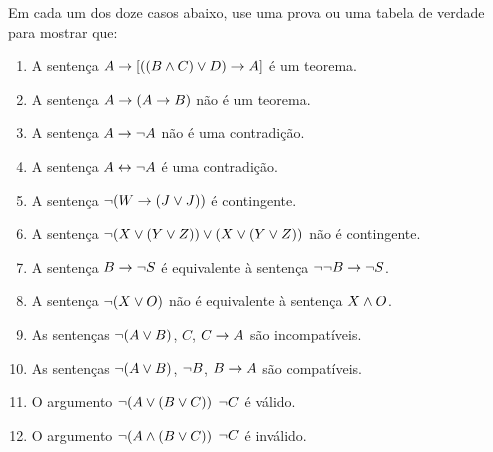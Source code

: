 \practiceproblems
\noindent\problempart Em cada um dos doze casos abaixo, use uma  prova ou uma tabela de verdade para mostrar que: 
\begin{enumerate}%
\item  A sentença $A \rightarrow [((B \wedge C) \vee D) \rightarrow A]$  é um teorema.
\item  A sentença $A \rightarrow (A \rightarrow B)$  não é um teorema.
\item  A sentença $A \rightarrow \neg{A}$ não é uma contradição. 
\item  A sentença $A \leftrightarrow \neg A$ é uma contradição.  
\item  A sentença $ \neg (W \rightarrow (J \vee J)) $  é contingente.
\item  A sentença $ \neg(X \vee (Y \vee Z)) \vee (X \vee (Y \vee Z))$  não é contingente.
\item  A sentença $B \rightarrow \neg S$  é equivalente à sentença $\neg \neg B \rightarrow \neg S$.
\item  A sentença $ \neg (X \vee O) $ não é equivalente à sentença $X \wedge O$.
\item  As sentenças $\neg(A \vee B)$, $C$, $C \rightarrow A$  são incompatíveis.
\item  As sentenças $\neg(A \vee B)$, $\neg{B}$, $B \rightarrow A$ são compatíveis.
\item  O argumento $\neg(A \vee (B \vee C)) $ \therefore $ \neg{C}$ é válido.
\item  O argumento $\neg(A \wedge (B \vee C))$ \therefore $ \neg{C}$ é  inválido.
\end{enumerate}



